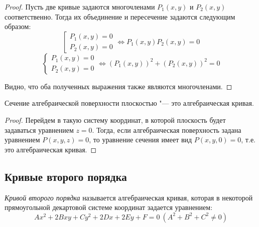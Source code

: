 \begin{proof}
	Пусть две кривые задаются многочленами $P_1(x, y)$ и $P_2(x, y)$ соответственно. Тогда их объединение и пересечение задаются следующим образом:
	\[
	\left[
	\begin{aligned}
	P_1(x, y) = 0\\
	P_2(x, y) = 0
	\end{aligned}
	\right. \Leftrightarrow P_1(x, y)P_2(x, y) = 0\]
	\[
	\left\{
	\begin{aligned}
	P_1(x, y) = 0\\
	P_2(x, y) = 0
	\end{aligned}
	\right. \Leftrightarrow (P_1(x, y))^2 + (P_2(x, y))^2 = 0
	\]
	
	Видно, что оба полученных выражения также являются многочленами.
\end{proof}

\begin{proposition}
	Сечение алгебраической поверхности плоскостью "--- это алгебраическая кривая.
\end{proposition}

\begin{proof}
	Перейдем в такую систему координат, в которой плоскость будет задаваться уравнением $z = 0$. Тогда, если алгебраическая поверхность задана уравнением $P(x, y, z) = 0$, то уравнение сечения имеет вид $P(x, y, 0) = 0$, т.\:е. это алгебраическая кривая.
\end{proof}

\subsection{Кривые второго порядка}

\begin{definition}
	\textit{Кривой второго порядка} называется алгебраическая кривая, которая в некоторой прямоугольной декартовой системе координат задается уравнением:
	\[Ax^2 + 2Bxy + Cy^2 + 2Dx + 2Ey + F = 0~(A^2 + B^2 + C^2 \ne 0)\]
\end{definition}

